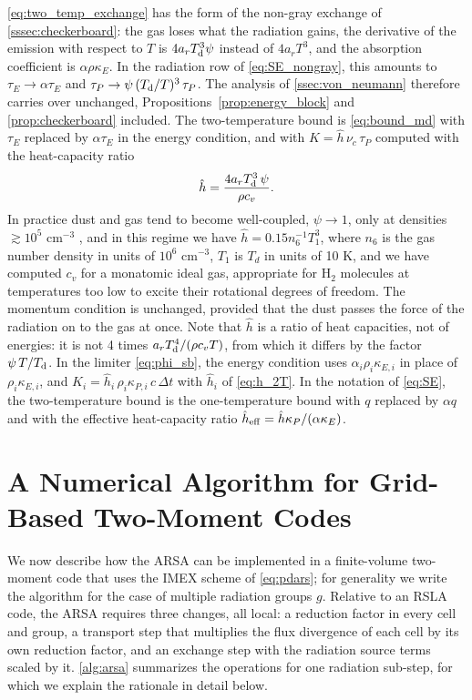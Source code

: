 \documentclass[preprint,12pt,authoryear]{elsarticle}
\begin{document}
\autoref{eq:two_temp_exchange} has the form of the non-gray exchange of \autoref{sssec:checkerboard}: the gas loses what the radiation gains, the derivative of the emission with respect to $T$ is $4 a_r T_{\rm d}^3\psi$ instead of $4 a_r T^3$, and the absorption coefficient is $\alpha\rho\kappa_E$. In the radiation row of \autoref{eq:SE_nongray}, this amounts to $\tau_E \to \alpha\tau_E$ and $\tau_P \to \psi\,(T_{\rm d}/T)^3\,\tau_P$. The analysis of \autoref{ssec:von_neumann} therefore carries over unchanged, Propositions~\ref{prop:energy_block} and \ref{prop:checkerboard} included. The two-temperature bound is \autoref{eq:bound_md} with $\tau_E$ replaced by $\alpha\tau_E$ in the energy condition, and with $K = \hat{h}\,\nu_c\,\tau_P$ computed with the heat-capacity ratio
\begin{equation}
    \hat{h} = \frac{4 a_r T_{\rm d}^3\,\psi}{\rho c_v} .
    \label{eq:h_2T}
\end{equation}
In practice dust and gas tend to become well-coupled, $\psi \to 1$, only at densities $\gtrsim 10^5$ cm$^{-3}$ \citep[e.g.,][]{Goldsmith01a}, and in this regime we have $\hat{h} = 0.15 n_6^{-1} T_1^3$, where $n_6$ is the gas number density in units of $10^6$ cm$^{-3}$, $T_1$ is $T_d$ in units of 10 K, and we have computed $c_v$ for a monatomic ideal gas, appropriate for H$_2$ molecules at temperatures too low to excite their rotational degrees of freedom.
The momentum condition is unchanged, provided that the dust passes the force of the radiation on to the gas at once. Note that $\hat{h}$ is a ratio of heat capacities, not of energies: it is not 4 times $a_r T_{\rm d}^4/(\rho c_v T)$, from which it differs by the factor $\psi\,T/T_{\rm d}$. In the limiter \autoref{eq:phi_sb}, the energy condition uses $\alpha_i\rho_i\kappa_{E,i}$ in place of $\rho_i\kappa_{E,i}$, and $K_i = \hat{h}_i\,\rho_i\kappa_{P,i}\,c\,\Delta t$ with $\hat{h}_i$ of \autoref{eq:h_2T}. In the notation of \autoref{eq:SE}, the two-temperature bound is the one-temperature bound with $q$ replaced by $\alpha q$ and with the effective heat-capacity ratio $\hat{h}_{\rm eff} = \hat{h}\kappa_P/(\alpha\kappa_E)$.


\section{A Numerical Algorithm for Grid-Based Two-Moment Codes}
\label{sec:implementation}

We now describe how the ARSA can be implemented in a finite-volume two-moment code that uses the IMEX scheme of \autoref{eq:pdars}; for generality we write the algorithm for the case of multiple radiation groups $g$. Relative to an RSLA code, the ARSA requires three changes, all local: a reduction factor in every cell and group, a transport step that multiplies the flux divergence of each cell by its own reduction factor, and an exchange step with the radiation source terms scaled by it. \autoref{alg:arsa} summarizes the operations for one radiation sub-step, for which we explain the rationale in detail below.
\end{document}
